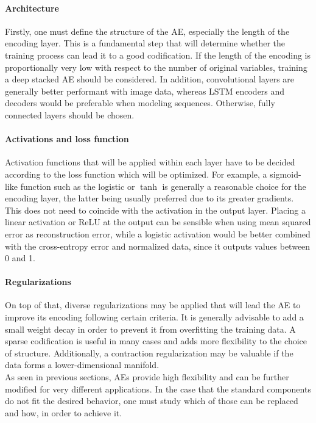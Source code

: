 \documentclass[preprint,5p,compress]{elsarticle}
\begin{document}
\paragraph{Architecture} Firstly, one must define the structure of the AE, especially the length of the encoding layer. This is a fundamental step that will determine whether the training process can lead it to a good codification. If the length of the encoding is proportionally very low with respect to the number of original variables, training a deep stacked AE should be considered. In addition, convolutional layers are generally better performant with image data, whereas LSTM encoders and decoders would be preferable when modeling sequences. Otherwise, fully connected layers should be chosen. 

\paragraph{Activations and loss function} Activation functions that will be applied within each layer have to be decided according to the loss function which will be optimized. For example, a sigmoid-like function such as the logistic or $\tanh$ is generally a reasonable choice for the encoding layer, the latter being usually preferred due to its greater gradients. This does not need to coincide with the activation in the output layer. Placing a linear activation or ReLU at the output can be sensible when using mean squared error as reconstruction error, while a logistic activation would be better combined with the cross-entropy error and normalized data, since it outputs values between 0 and 1.

\paragraph{Regularizations} On top of that, diverse regularizations may be applied that will lead the AE to improve its encoding following certain criteria. It is generally advisable to add a small weight decay in order to prevent it from overfitting the training data. A sparse codification is useful in many cases and adds more flexibility to the choice of structure. Additionally, a contraction regularization may be valuable if the data forms a lower-dimensional manifold. \\

As seen in previous sections, AEs provide high flexibility and can be further modified for very different applications. In the case that the standard components do not fit the desired behavior, one must study which of those can be replaced and how, in order to achieve it.
\end{document}

